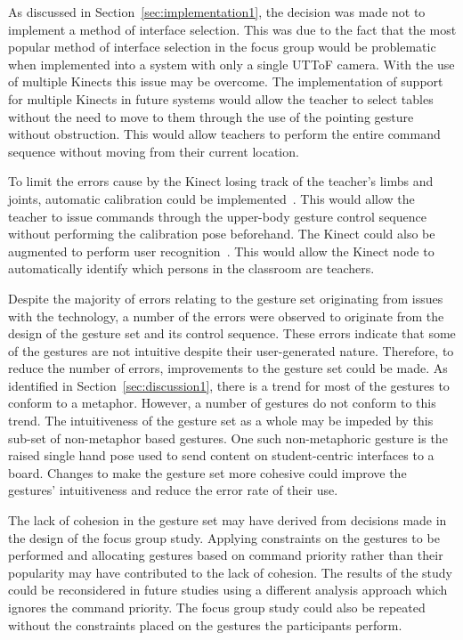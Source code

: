 \documentclass[manuscript, review, screen]{acmart}
\begin{document}
As discussed in Section~\ref{sec:implementation1}, the decision was made not to implement a method of interface selection.
This was due to the fact that the most popular method of interface selection in the focus group would be problematic when implemented into a system with only a single \ac{UTToF} camera.
With the use of multiple Kinects this issue may be overcome. 
The implementation of support for multiple Kinects in future systems would allow the teacher to select tables without the need to move to them through the use of the pointing gesture without obstruction.
This would allow teachers to perform the entire command sequence without moving from their current location.

To limit the errors cause by the Kinect losing track of the teacher's limbs and joints, automatic calibration could be implemented~\cite{Bellmore2011}.
This would allow the teacher to issue commands through the upper-body gesture control sequence without performing the calibration pose beforehand.
The Kinect could also be augmented to perform user recognition~\cite{Leyvand2011}.
This would allow the Kinect node to automatically identify which persons in the classroom are teachers.

Despite the majority of errors relating to the gesture set originating from issues with the technology, a number of the errors were observed to originate from the design of the gesture set and its control sequence.
These errors indicate that some of the gestures are not intuitive despite their user-generated nature.
Therefore, to reduce the number of errors, improvements to the gesture set could be made.
As identified in Section~\ref{sec:discussion1}, there is a trend for most of the gestures to conform to a metaphor.
However, a number of gestures do not conform to this trend.
The intuitiveness of the gesture set as a whole may be impeded by this sub-set of non-metaphor based gestures.
One such non-metaphoric gesture is the raised single hand pose used to send content on student-centric interfaces to a board.
Changes to make the gesture set more cohesive could improve the gestures' intuitiveness and reduce the error rate of their use.

The lack of cohesion in the gesture set may have derived from decisions made in the design of the focus group study.
Applying constraints on the gestures to be performed and allocating gestures based on command priority rather than their popularity may have contributed to the lack of cohesion.
The results of the study could be reconsidered in future studies using a different analysis approach which ignores the command priority.
The focus group study could also be repeated without the constraints placed on the gestures the participants perform.
\end{document}
